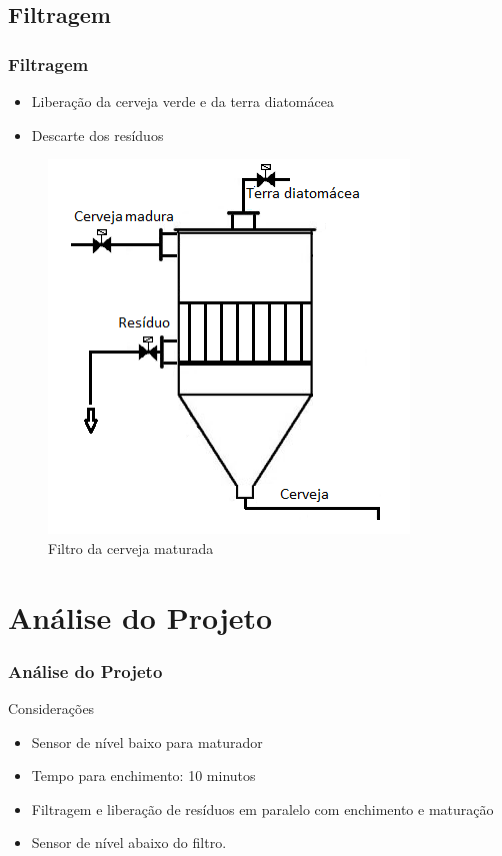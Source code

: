 \documentclass{beamer}
\begin{document}
\subsection{Filtragem}
\begin{frame}
	\frametitle{Filtragem}
	\begin{itemize}
		\item Liberação da cerveja verde e da terra diatomácea
		\item Descarte dos resíduos
	\end{itemize}
	
	
	\begin{figure}[H]
		\centering
		\includegraphics [width=0.3\linewidth]{filtro.png}
		\caption {Filtro da cerveja maturada}
		\label{fig:filtro}
	\end{figure}
\end{frame}

\section{Análise do Projeto}
\begin{frame}
\frametitle{Análise do Projeto}
	\begin{block}{Considerações}
		\begin{itemize}
		\item Sensor de nível baixo para maturador
		\item Tempo para enchimento: 10 minutos
		\item Filtragem e liberação de resíduos em paralelo com enchimento e maturação
		\item Sensor de nível abaixo do filtro.
		\end{itemize}
	\end{block}
\end{frame}
\end{document}
